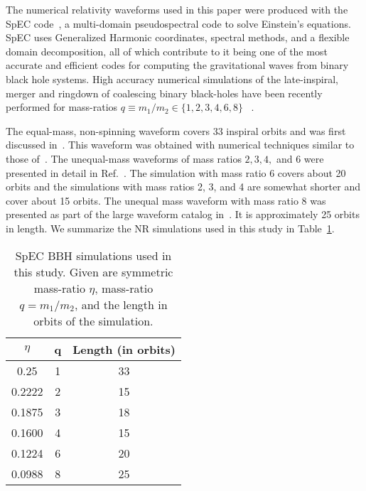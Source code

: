 
The numerical relativity waveforms used in this paper were produced
with the SpEC code~\cite{spec}, a multi-domain pseudospectral code to solve
Einstein’s equations. SpEC uses Generalized Harmonic coordinates,
spectral methods, and a flexible domain decomposition, all of which
contribute to it being one of the most accurate and efficient codes
for computing the gravitational waves from binary black hole
systems. High accuracy numerical simulations of the late-inspiral,
merger and ringdown  of coalescing binary black-holes have been
recently performed for mass-ratios $q\equiv m_1/m_2\in\{1,2,3,4,6,8\}$
~\cite{Buchman:2012dw,Scheel:2008rj,NRPNComparisonBoyleetal,Mroue:2012kv}.

The equal-mass,
non-spinning waveform covers 33 inspiral orbits and was first discussed
in~\cite{MacDonald:2012mp,Mroue:2012kv}. 
This waveform was obtained with numerical techniques similar to those 
of~\cite{Buchman:2012dw}. The unequal-mass waveforms of mass ratios 
$2, 3, 4,$ and $6$ were presented in detail in Ref.~\cite{Buchman:2012dw}.
The simulation with mass ratio $6$ covers about 20 orbits and the
simulations with mass ratios 2, 3, and 4 are somewhat shorter and
cover about 15 orbits. The unequal mass waveform with mass ratio 8 was
presented as part of the large waveform catalog
in~\cite{Mroue:2013xna,Mroue:2012kv}. It is approximately 25 orbits in
length. 
We summarize the NR simulations used in this study in 
Table~\ref{table:etalist4}.

\begin{table}
\begin{tabular}{| c | c | c |}
\hline
$\eta$ & q & Length (in orbits)\\ \hline
0.25 & 1 & 33 \\
0.2222 & 2 & 15 \\
0.1875 & 3 & 18 \\
0.1600 & 4 & 15 \\
0.1224 & 6 & 20 \\
0.0988 & 8 & 25 \\
\hline
\end{tabular}
\caption{SpEC BBH simulations used in this study.  Given are symmetric mass-ratio $\eta$, mass-ratio $q=m_1/m_2$, and the length in orbits of the simulation.}
\label{table:etalist4}
\end{table}
